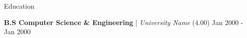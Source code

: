 \begin{rSection}{Education}

\textbf{B.S Computer Science \& Engineering} | \textit{University Name} \hfill {(4.00) Jan 2000 - Jan 2000}

\end{rSection}